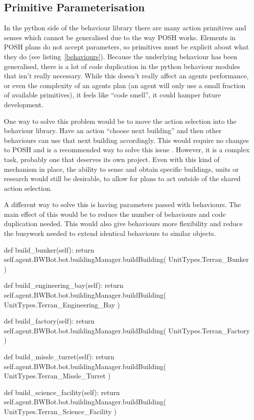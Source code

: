 \documentclass[11pt,openright,a4paper]{report}
\begin{document}
\subsection{Primitive Parameterisation}
In the python side of the behaviour library there are many action primitives and senses which cannot be generalised due to the way POSH works. Elements in POSH plans do not accept parameters, so primitives must be explicit about what they do (see listing~\ref{behaviours}). Because the underlying behaviour has been generalised, there is a lot of code duplication in the python behaviour modules that isn't really necessary. While this doesn't really affect an agents performance, or even the complexity of an agents plan (an agent will only use a small fraction of available primitives), it feels like ``code smell''\cite{Emden02javaquality}, it could hamper future development.

One way to solve this problem would be to move the action selection into the behaviour library. Have an action ``choose next building'' and then other behaviours can use that next building accordingly. This would require no changes to POSH and is a recommended way to solve this issue \cite{bryson2003behavior}. However, it is a complex task, probably one that deserves its own project. Even with this kind of mechanism in place, the ability to sense and obtain specific buildings, units or research would still be desirable, to allow for plans to act outside of the shared action selection.

A different way to solve this is having parameters passed with behaviours. The main effect of this would be to reduce the number of behaviours and code duplication needed. This would also give behaviours more flexibility and reduce the busywork needed to extend identical behaviours to similar objects.

\begin{Code}[frame=single,language=Python,tabsize=4,breaklines,breakatwhitespace,caption={A small selection of similar behaviours to build different buildings.},label=behaviours]
def build_bunker(self):
	return self.agent.BWBot.bot.buildingManager.buildBuilding( UnitTypes.Terran_Bunker )

def build_engineering_bay(self):
	return self.agent.BWBot.bot.buildingManager.buildBuilding( UnitTypes.Terran_Engineering_Bay )

def build_factory(self):
	return self.agent.BWBot.bot.buildingManager.buildBuilding( UnitTypes.Terran_Factory )

def build_missle_turret(self):
	return self.agent.BWBot.bot.buildingManager.buildBuilding( UnitTypes.Terran_Missle_Turret )

def build_science_facility(self):
	return self.agent.BWBot.bot.buildingManager.buildBuilding( UnitTypes.Terran_Science_Facility )
\end{Code}
\end{document}

